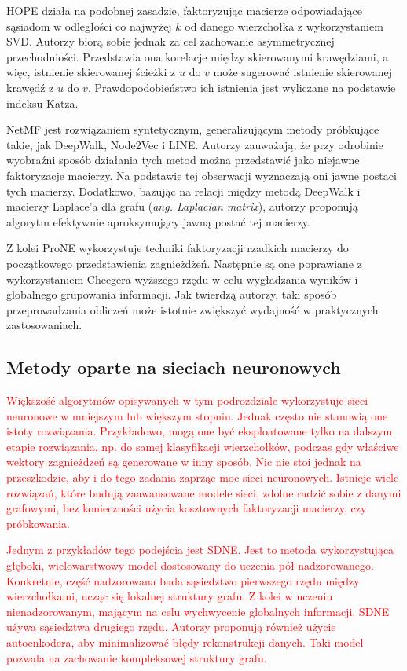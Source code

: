         HOPE\cite{Ou_Cui_Pei_Zhang_Zhu_2016} działa na podobnej zasadzie, faktoryzując macierze odpowiadające sąsiadom w odległości co najwyżej $k$ od danego wierzchołka z wykorzystaniem SVD. Autorzy biorą sobie jednak za cel zachowanie asymmetrycznej przechodniości. Przedstawia ona korelacje między skierowanymi krawędziami, a więc, istnienie skierowanej ścieżki z $u$ do $v$ może sugerować istnienie skierowanej krawędź z $u$ do $v$.  Prawdopodobieństwo ich istnienia jest wyliczane na podstawie indeksu Katza\cite{Katz_1953}. 
        
        NetMF\cite{Qiu_Dong_Ma_Li_Wang_Tang_2018} jest rozwiązaniem syntetycznym, generalizującym  metody próbkujące takie, jak DeepWalk, Node2Vec i LINE. Autorzy zauważają, że przy odrobinie wyobraźni sposób działania tych metod można przedstawić jako niejawne faktoryzacje macierzy. Na podstawie tej obserwacji wyznaczają oni jawne postaci tych macierzy. Dodatkowo, bazując na relacji między metodą DeepWalk i macierzy Laplace'a dla grafu (\emph{ang. Laplacian matrix}), autorzy proponują algorytm efektywnie aproksymujący jawną postać tej macierzy.
        
        Z kolei ProNE\cite{Zhang_Dong_Wang_Tang_Ding_2019} wykorzystuje techniki faktoryzacji rzadkich macierzy do początkowego przedstawienia zagnieżdżeń. Następnie są one poprawiane z wykorzystaniem Cheegera wyższego rzędu w celu wygładzania wyników i globalnego grupowania informacji. Jak twierdzą autorzy, taki sposób przeprowadzania obliczeń może istotnie zwiększyć wydajność w praktycznych zastosowaniach.

    \subsection{Metody oparte na sieciach neuronowych}
        \textcolor{red}{
        Większość algorytmów opisywanych w tym podrozdziale wykorzystuje sieci neuronowe w mniejszym lub większym stopniu. Jednak często nie stanowią one istoty rozwiązania. Przykładowo, mogą one być eksploatowane tylko na dalszym etapie rozwiązania, np. do samej klasyfikacji wierzchołków, podczas gdy właściwe wektory zagnieżdzeń są generowane w inny sposób. Nic nie stoi jednak na przeszkodzie, aby i do tego zadania zaprząc moc sieci neuronowych. Istnieje wiele rozwiązań, które budują zaawansowane modele sieci, zdolne radzić sobie z danymi grafowymi, bez konieczności użycia kosztownych faktoryzacji macierzy, czy próbkowania.}

        \textcolor{red}{
        Jednym z przykładów tego podejścia jest SDNE\cite{Wang_Cui_Zhu_2016}. Jest to metoda wykorzystująca głęboki, wielowarstwowy model dostosowany do uczenia pół-nadzorowanego. Konkretnie, część nadzorowana bada sąsiedztwo pierwszego rzędu między wierzchołkami, ucząc się lokalnej struktury grafu. Z kolei w uczeniu nienadzorowanym, mającym na celu wychwycenie globalnych informacji, SDNE używa sąsiedztwa drugiego rzędu. Autorzy proponują również użycie autoenkodera, aby minimalizować błędy rekonstrukcji danych. Taki model pozwala na zachowanie kompleksowej struktury grafu.}
        
